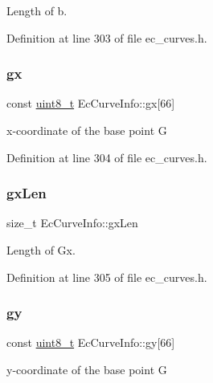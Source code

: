 Length of b. 



Definition at line 303 of file ec\+\_\+curves.\+h.

\mbox{\label{structEcCurveInfo_af597b54fc23acc8720b3e3437a02fe97}} 
\subsubsection{\texorpdfstring{gx}{gx}}
{\footnotesize\ttfamily const \hyperlink{stdint_8h_aba7bc1797add20fe3efdf37ced1182c5}{uint8\+\_\+t} Ec\+Curve\+Info\+::gx\mbox{[}66\mbox{]}}



x-\/coordinate of the base point G 



Definition at line 304 of file ec\+\_\+curves.\+h.

\mbox{\label{structEcCurveInfo_a07f921dede7646b015a3c5f6f439561c}} 
\subsubsection{\texorpdfstring{gx\+Len}{gxLen}}
{\footnotesize\ttfamily size\+\_\+t Ec\+Curve\+Info\+::gx\+Len}



Length of Gx. 



Definition at line 305 of file ec\+\_\+curves.\+h.

\mbox{\label{structEcCurveInfo_ae82180f4fb48879aed2d8939c004fc3d}} 
\subsubsection{\texorpdfstring{gy}{gy}}
{\footnotesize\ttfamily const \hyperlink{stdint_8h_aba7bc1797add20fe3efdf37ced1182c5}{uint8\+\_\+t} Ec\+Curve\+Info\+::gy\mbox{[}66\mbox{]}}



y-\/coordinate of the base point G 



